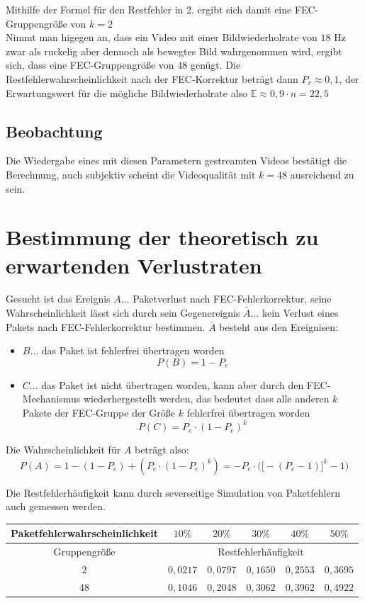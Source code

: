 \documentclass[12pt,a4paper]{article}
\begin{document}
Mithilfe der Formel für den Restfehler in 2. ergibt sich damit eine FEC-Gruppengröße von $k = 2$\\

Nimmt man higegen an, dass ein Video mit einer Bildwiederholrate von $18 \textrm{ Hz}$ zwar als ruckelig aber dennoch als bewegtes Bild wahrgenommen wird, ergibt sich, dass eine FEC-Gruppengröße von 48 genügt. Die Restfehlerwahrscheinlichkeit nach der FEC-Korrektur beträgt dann $P_r \approx 0,1$, der Erwartungswert für die mögliche Bildwiederholrate also $\mathbb{E} \approx 0,9 \cdot n = 22,5$

\subsection{Beobachtung}

Die Wiedergabe eines mit diesen Parametern gestreamten Videos bestätigt die Berechnung, auch subjektiv scheint die Videoqualität mit $k=48$ ausreichend zu sein. 

\section{Bestimmung der theoretisch zu erwartenden Verlustraten}

Gesucht ist das Ereignis $A \dots$ Paketverlust nach FEC-Fehlerkorrektur, seine Wahrscheinlichkeit lässt sich durch sein Gegenereignis $\bar{A} \dots$ kein Verlust eines Pakets nach FEC-Fehlerkorrektur bestimmen. $\bar{A}$ besteht aus den Ereignisen:

\begin{itemize}
	\item $B \dots$ das Paket ist fehlerfrei übertragen worden $$P(B) = 1 - P_e$$
	\item $C \dots$ das Paket ist nicht übertragen worden, kann aber durch den FEC-Mechanismus wiederhergestellt werden, das bedeutet dass alle anderen $k$ Pakete der FEC-Gruppe der Größe $k$ fehlerfrei übertragen worden $$P(C) = P_e \cdot (1 - P_e)^k$$
\end{itemize}

Die Wahrscheinlichkeit für $A$ beträgt also: $$P(A) = 1 - (1 - P_e) + (P_e \cdot (1 - P_e)^k) = - P_e \cdot \biggl( \bigl[ - (P_e - 1) \bigr]^k - 1 \biggr)$$

Die Restfehlerhäufigkeit kann durch severseitige Simulation von Paketfehlern auch gemessen werden. 

\begin{tabular}{c||c|c|c|c|c}
	Paketfehlerwahrscheinlichkeit & $10\%$ & $20\%$ & $30\%$ & $40\%$ & $50\%$ \\
	\hline
	Gruppengröße & \multicolumn{5}{|c}{Restfehlerhäufigkeit} \\
	\hline \hline
	$2$ &  $0,0217$ & $0,0797$ & $0,1650$ & $0,2553$ & $0,3695$\\
	$48$ & $0,1046$ & $0,2048$ & $0,3062$ & $0,3962$ & $0,4922$
\end{tabular}
\end{document}
